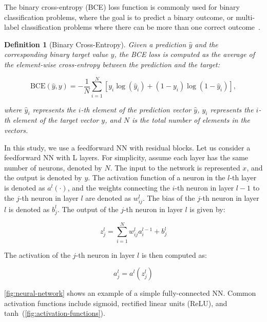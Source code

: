 \documentclass[ppgc,diss,english]{iiufrgs}
\newtheorem{definition}{Definition}
\begin{document}
The binary cross-entropy (BCE) loss function is commonly used for binary classification problems, where the goal is to predict a binary outcome, or multi-label classification problems where there can be more than one correct outcome~\cite{Tsoumakas.etal/2007}.
\begin{definition}[Binary Cross-Entropy]\label{def:mse}
Given a prediction $\hat{y}$ and the corresponding binary target value $y$, the BCE loss is computed as the average of the element-wise cross-entropy between the prediction and the target:

$$\text{BCE}(\hat{y}, y) = -\frac{1}{N} \sum_{i=1}^{N} \left[y_i \log(\hat{y}_i) + (1 - y_i) \log(1 - \hat{y}_i)\right],$$

where $\hat{y}_i$ represents the $i$-th element of the prediction vector $\hat{y}$, $y_i$ represents the $i$-th element of the target vector $y$, and $N$ is the total number of elements in the vectors.
\end{definition}

In this study, we use a feedforward NN with residual blocks.
Let us consider a feedforward NN with L layers. For simplicity, assume each layer has the same number of neurons, denoted by $N$. The input to the network is represented $x$, and the output is denoted by $y$. The activation function of a neuron in the $l$-th layer is denoted as $a^l(\cdot)$, and the weights connecting the $i$-th neuron in layer $l-1$ to the $j$-th neuron in layer $l$ are denoted as $w^{l}_{ij}$. The bias of the $j$-th neuron in layer $l$ is denoted as $b^{l}_{j}$. The output of the $j$-th neuron in layer $l$ is given by:

$$z^{l}_{j} = \sum_{i=1}^{N} w^{l}_{ij} a^{l-1}_{i} + b^{l}_{j}$$

The activation of the $j$-th neuron in layer $l$ is then computed as:

$$a^{l}_{j} = a^{l}(z^{l}_{j})$$

\cref{fig:neural-network} shows an example of a simple fully-connected NN. Common activation functions include sigmoid, rectified linear units (ReLU), and tanh~(\cref{fig:activation-functions}).
\end{document}
